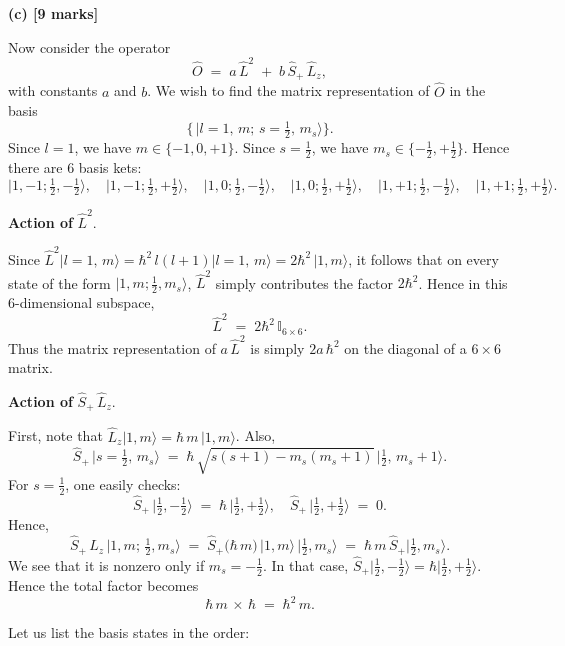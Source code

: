 \documentclass{article}
\begin{document}
\bigskip

\textbf{(c) [9 marks]}

Now consider the operator
\[
\hat{O} \;=\; a\,\hat{L}^2 \;+\; b\,\hat{S}_+\,\hat{L}_z,
\]
with constants \(a\) and \(b\). We wish to find the matrix representation of \(\hat{O}\) in the basis
\[
\bigl\{\,\lvert l=1,\,m;\,s=\tfrac{1}{2},\,m_s\rangle \bigr\}.
\]
Since \(l=1\), we have \(m \in \{-1,0,+1\}\). Since \(s=\tfrac{1}{2}\), we have \(m_s \in \{-\tfrac12, +\tfrac12\}\). Hence there are 6 basis kets:
\[
\lvert 1, -1; \tfrac12, -\tfrac12\rangle, \quad
\lvert 1, -1; \tfrac12, +\tfrac12\rangle, \quad
\lvert 1, 0; \tfrac12, -\tfrac12\rangle, \quad
\lvert 1, 0; \tfrac12, +\tfrac12\rangle, \quad
\lvert 1, +1; \tfrac12, -\tfrac12\rangle, \quad
\lvert 1, +1; \tfrac12, +\tfrac12\rangle.
\]

\medskip

\noindent
\textbf{Action of} \(\hat{L}^2\). 

Since \(\hat{L}^2 \lvert l=1,\,m\rangle = \hbar^2\,l(l+1)\lvert l=1,\,m\rangle = 2\hbar^2\,\lvert 1,m\rangle\), it follows that on every state of the form \(\lvert 1,m; \tfrac12,m_s\rangle\), \(\hat{L}^2\) simply contributes the factor \(2\hbar^2\). Hence in this 6-dimensional subspace,
\[
\hat{L}^2 \;=\; 2\hbar^2 \,\mathbb{I}_{6\times 6}.
\]
Thus the matrix representation of \(a\,\hat{L}^2\) is simply \(2a\,\hbar^2\) on the diagonal of a \(6\times 6\) matrix.

\medskip

\noindent
\textbf{Action of} \(\hat{S}_+\,\hat{L}_z\).

First, note that \(\hat{L}_z\lvert 1,m\rangle = \hbar\,m\,\lvert 1,m\rangle\). Also,
\[
\hat{S}_+ \,\lvert s=\tfrac12,\,m_s\rangle
\;=\;
\hbar\,\sqrt{s(s+1) - m_s(m_s+1)}
\,\lvert \tfrac12,\,m_s + 1\rangle.
\]
For \(s=\tfrac12\), one easily checks:
\[
\hat{S}_+\,\lvert \tfrac12,-\tfrac12\rangle
\;=\;
\hbar\,\lvert \tfrac12,+\tfrac12\rangle,
\quad
\hat{S}_+\,\lvert \tfrac12,+\tfrac12\rangle
\;=\;
0.
\]
Hence,
\[
\hat{S}_+\,\hat{L}_z\,\lvert 1,m;\,\tfrac12, m_s\rangle
\;=\;
\hat{S}_+
\bigl(\hbar\,m\bigr)\,\lvert 1,m\rangle\,\lvert \tfrac12,m_s\rangle
\;=\;
\hbar\,m\,\hat{S}_+\lvert \tfrac12,m_s\rangle.
\]
We see that it is nonzero only if \(m_s=-\tfrac12\). In that case, 
\(\hat{S}_+\lvert \tfrac12,-\tfrac12\rangle = \hbar \lvert \tfrac12,+\tfrac12\rangle\). 
Hence the total factor becomes
\[
\hbar\,m \,\times\, \hbar 
\;=\;
\hbar^2\,m.
\]

Let us list the basis states in the order:
\end{document}

